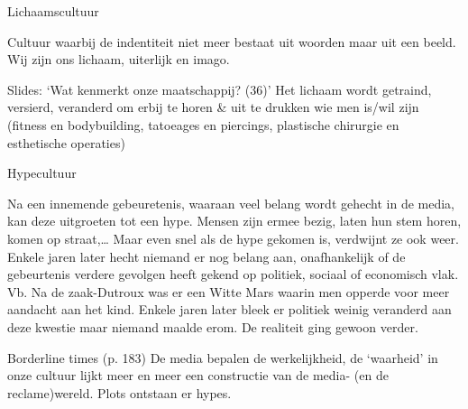 \documentclass[main.tex]{subfiles}
\begin{document}
\begin{examenvraag}
    \begin{vraag}
        Lichaamscultuur
    \end{vraag}
    \begin{antwoord}
        Cultuur waarbij de indentiteit niet meer bestaat uit woorden maar uit 
        een beeld.‭ ‬Wij zijn ons 	
        lichaam,‭ ‬uiterlijk en imago.
        \begin{citaat}{Slides: `Wat kenmerkt onze maatschappij? (36)'}
            Het lichaam wordt getraind, versierd, veranderd om erbij te horen \& uit te drukken wie men is/wil zijn (fitness en 
            bodybuilding, tatoeages en piercings, plastische chirurgie en esthetische operaties)
        \end{citaat}	
    \end{antwoord}
\end{examenvraag}


\begin{examenvraag}
    \begin{vraag}
        Hypecultuur
    \end{vraag}

    \begin{antwoord}
        Na een innemende gebeuretenis,‭ ‬waaraan veel belang wordt gehecht in de media,‭ ‬kan deze 
        uitgroeten tot een‭ ‬hype.‭ ‬Mensen zijn ermee bezig,‭ ‬laten hun stem horen,‭ ‬komen op straat,‭…‬ 
        Maar even snel als de hype gekomen is,‭ ‬verdwijnt ze ook weer.‭ ‬Enkele jaren later hecht 
        niemand er nog belang aan,‭ ‬onafhankelijk of de gebeurtenis verdere gevolgen heeft gekend op 
        politiek,‭ ‬sociaal of economisch vlak.‭ ‬Vb.‭ ‬Na de zaak-Dutroux was er een Witte Mars waarin 
        men opperde voor meer aandacht aan het kind.‭ ‬Enkele jaren later bleek er politiek weinig 
        veranderd aan deze kwestie maar niemand maalde erom.‭ ‬De realiteit ging gewoon verder.
        \begin{citaat}{Borderline times (p. 183)}
            De media bepalen de werkelijkheid, de `waarheid' in onze cultuur lijkt meer en meer een constructie van de media- (en de reclame)wereld.
            Plots ontstaan er hypes.
        \end{citaat}
    \end{antwoord}
\end{examenvraag}
\end{document}
